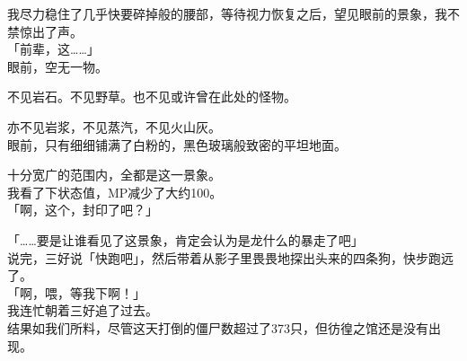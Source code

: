我尽力稳住了几乎快要碎掉般的腰部，等待视力恢复之后，望见眼前的景象，我不禁惊出了声。\\

「前辈，这……」\\

眼前，空无一物。

不见岩石。不见野草。也不见或许曾在此处的怪物。

亦不见岩浆，不见蒸汽，不见火山灰。\\

眼前，只有细细铺满了白粉的，黑色玻璃般致密的平坦地面。

十分宽广的范围内，全都是这一景象。\\

我看了下状态值，MP减少了大约100。\\

「啊，这个，封印了吧？」

「……要是让谁看见了这景象，肯定会认为是龙什么的暴走了吧」\\

说完，三好说「快跑吧」，然后带着从影子里畏畏地探出头来的四条狗，快步跑远了。\\

「啊，喂，等我下啊！」\\

我连忙朝着三好追了过去。\\

结果如我们所料，尽管这天打倒的僵尸数超过了373只，但彷徨之馆还是没有出现。\\
